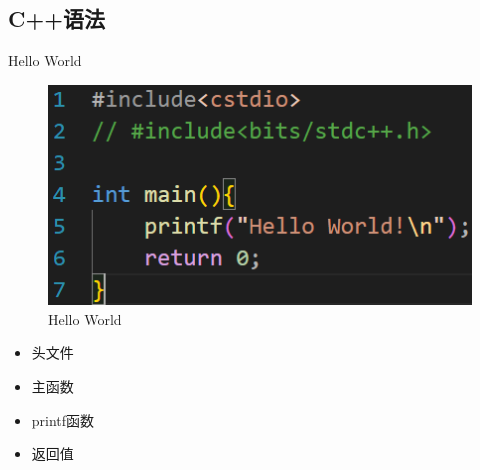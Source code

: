 \documentclass{beamer}
\begin{document}
\subsection{C++语法}
\begin{frame}{Hello World}
    \begin{minipage}{0.45\linewidth}
        \begin{figure}
        \centering
        \includegraphics[width=\linewidth]{pic/Hello World.png}
        \caption{Hello World}
        \label{fig:helloworld}
    \end{figure}
    \end{minipage}
    \hspace{1cm}
    \begin{minipage}{0.37\linewidth}
        \begin{itemize}
            \item 头文件
            \item 主函数
            \item printf函数
            \item 返回值
        \end{itemize}
    \end{minipage}
\end{frame}
\end{document}
